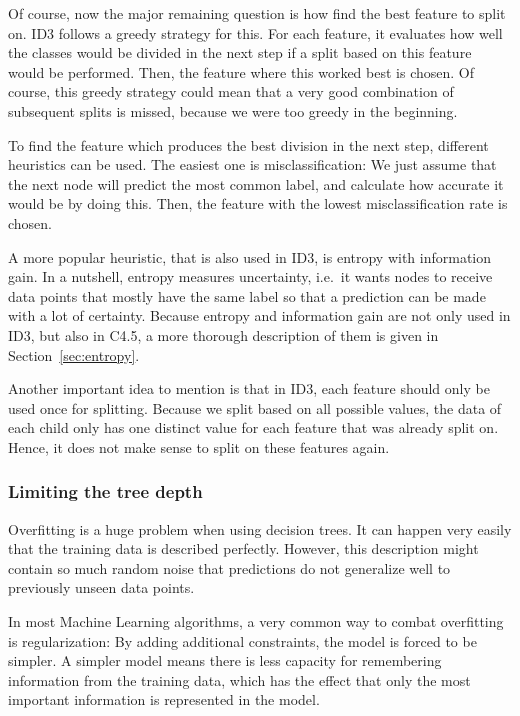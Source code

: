 \documentclass[a4paper]{article}
\begin{document}
Of course, now the major remaining question is how find the best feature to split on. ID3 follows a greedy strategy for this. For each feature, it evaluates how well the classes would be divided in the next step if a split based on this feature would be performed. Then, the feature where this worked best is chosen. Of course, this greedy strategy could mean that a very good combination of subsequent splits is missed, because we were too greedy in the beginning.

To find the feature which produces the best division in the next step, different heuristics can be used. The easiest one is misclassification: We just assume that the next node will predict the most common label, and calculate how accurate it would be by doing this. Then, the feature with the lowest misclassification rate is chosen.

A more popular heuristic, that is also used in ID3, is entropy with information gain. In a nutshell, entropy measures uncertainty, i.e.\ it wants nodes to receive data points that mostly have the same label so that a prediction can be made with a lot of certainty. Because entropy and information gain are not only used in ID3, but also in C4.5, a more thorough description of them is given in Section~\ref{sec:entropy}.

Another important idea to mention is that in ID3, each feature should only be used once for splitting. Because we split based on all possible values, the data of each child only has one distinct value for each feature that was already split on. Hence, it does not make sense to split on these features again.

\subsubsection{Limiting the tree depth}
\label{subsec:id3-depth}

Overfitting is a huge problem when using decision trees. It can happen very easily that the training data is described perfectly. However, this description might contain so much random noise that predictions do not generalize well to previously unseen data points.

In most Machine Learning algorithms, a very common way to combat overfitting is regularization: By adding additional constraints, the model is forced to be simpler. A simpler model means there is less capacity for remembering information from the training data, which has the effect that only the most important information is represented in the model.
\end{document}
